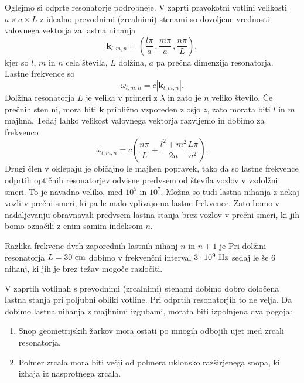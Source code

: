 Oglejmo si odprte resonatorje podrobneje. V zaprti pravokotni votlini velikosti
$a\times a\times L$ z idealno prevodnimi (zrcalnimi) stenami so dovoljene vrednosti
valovnega vektorja za lastna nihanja 
\begin{equation}
\mathbf{k}_{l,m,n}=\left(\frac{l\pi}{a}\,,\frac{m\pi}{a}\,,\frac{n\pi}{L}\right),\label{eq:k-votlina}
\end{equation}
 kjer so $l$, $m$ in $n$ cela števila, $L$ dolžina, $a$ pa prečna
dimenzija resonatorja. Lastne frekvence so 
\begin{equation}
\omega_{l,m,n}=c|\mathbf{k}_{l,m,n}|.\label{eq:omega-votlina}
\end{equation}
Dolžina resonatorja $L$ je velika v primeri z $\lambda$ in zato je $n$
veliko število. Če prečnih sten ni, mora biti $\mathbf{k}$ približno
vzporeden z osjo $z$, zato morata biti $l$ in $m$ majhna. Tedaj
lahko velikost valovnega vektorja razvijemo in dobimo za frekvenco
\begin{equation}
\omega_{l,m,n}=c\left(\frac{n\pi}{L}+\frac{l^{2}+m^{2}}{2n}\frac{L \pi}{a^{2}}\right).
\label{eq:delta-omega-resonator-razvoj}
\end{equation}
Drugi člen v oklepaju je običajno le majhen popravek, tako da so
lastne frekvence odprtih optičnih resonatorjev odvisne predvsem od
števila vozlov v vzdolžni smeri. To je navadno veliko, med $10^{5}$
in $10^{7}$. Možna so tudi lastna nihanja z nekaj vozli v prečni
smeri, ki pa le malo vplivajo na lastne frekvence. Zato bomo v nadaljevanju
obravnavali predvsem lastna stanja brez vozlov v prečni smeri, ki
jih bomo označili z enim samim indeksom $n$.

Razlika frekvenc dveh zaporednih lastnih nihanj $n$ in $n+1$ je
Pri dolžini resonatorja $L=30~\centi\metre$ dobimo v frekvenčni
interval $3\cdot10^{9}~\hertz$ sedaj le še $6$ nihanj, ki jih
je brez težav mogoče razločiti.

V zaprtih votlinah s prevodnimi (zrcalnimi) stenami dobimo dobro določena lastna
stanja pri poljubni obliki votline. Pri odprtih resonatorjih to ne velja.
Da dobimo lastna nihanja z majhnimi izgubami, morata
biti izpolnjena dva pogoja:

\begin{enumerate} 
\item Snop geometrijskih žarkov mora ostati po mnogih odbojih ujet med zrcali resonatorja.\\
\item Polmer zrcala mora biti večji od polmera uklonsko razširjenega snopa, ki izhaja iz nasprotnega zrcala. \\
\end{enumerate}

